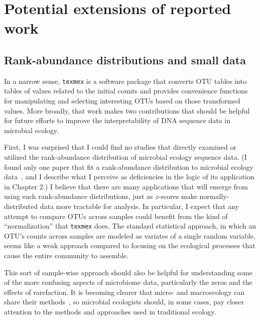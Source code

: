 \section{Potential extensions of reported work}
\subsection{Rank-abundance distributions and small data}
In a narrow sense, \texttt{texmex} is a software package that converts OTU tables
into tables of values related to the initial counts and provides convenience
functions for manipulating and selecting interesting OTUs based on those
transformed values. More broadly, that work makes two contributions that should
be helpful for future efforts to improve the interpretability of DNA sequence
data in microbial ecology.

First, I was surprised that I could find no studies that directly
examined or utilized the rank-abundance distribution of microbial ecology
sequence data. (I found only one paper that fit a rank-abundance distribution to
microbial ecology data~\cite{kembel_incorporating_2012}, and I describe what I
perceive as deficiencies in the logic of its application in Chapter 2.) I
believe that there are many applications that will emerge from using such
rank-abundance distributions, just as $z$-scores make normally-distributed data
more tractable for analysis. In particular, I expect that any attempt to
compare OTUs across samples could benefit from the kind of ``normalization''
that \texttt{texmex} does.
The standard statistical approach, in which an OTU's counts across samples are
modeled as variates of a single random variable, seems like a weak approach
compared to focusing on the ecological processes that cause the entire community
to assemble.

This sort of sample-wise approach should also be helpful for understanding some
of the more confusing aspects of microbiome data, particularly the zeros and
the effects of rarefaction.
It is becoming clearer that micro- and macroecology can share their methods~\cite{hughes_counting_2001},
so microbial ecologists should, in some cases, pay closer attention to the
methods and approaches used in traditional ecology.

